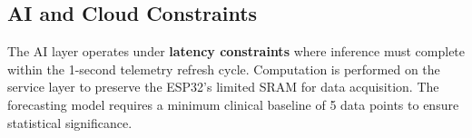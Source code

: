 \subsection*{AI and Cloud Constraints}

The AI layer operates under \textbf{latency constraints} where inference must complete within the 1-second telemetry refresh cycle. Computation is performed on the service layer to preserve the ESP32's limited SRAM for data acquisition. The forecasting model requires a minimum clinical baseline of 5 data points to ensure statistical significance.
